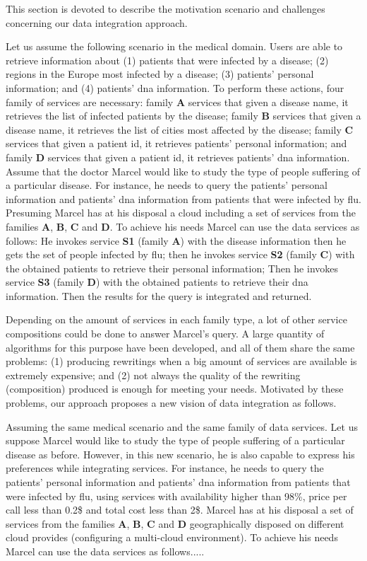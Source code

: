 This section is devoted to describe the motivation scenario and challenges
concerning our data integration approach.
%

Let us assume the following scenario in the medical domain. 
Users are able to retrieve information about (1) patients that were infected by a disease; 
(2) regions in the Europe most infected by a disease; 
(3) patients' personal information; and 
(4) patients' dna information.
To perform these actions, four family of services are necessary: family \textbf{A} services that given a disease name, it retrieves the list of infected patients by the disease; family \textbf{B} services that given a disease name, it retrieves the list of cities most affected by the disease; family \textbf{C} services that given a patient id, it retrieves patients' personal information; and family \textbf{D} services that given a patient id, it retrieves patients' dna information. Assume that the doctor Marcel would like to study the type of people suffering of a particular disease. For instance, he needs to query the patients' personal information and patients' dna information from patients that were infected by flu. Presuming Marcel has at his disposal a cloud including a set of services from the families \textbf{A}, \textbf{B}, \textbf{C} and \textbf{D}. To achieve his needs Marcel can use the data services  as follows: He invokes service \textbf{S1} (family \textbf{A}) with the disease information then he gets the set of people infected by flu; then he invokes service \textbf{S2} (family \textbf{C}) with the obtained patients to retrieve their personal information; Then he invokes service \textbf{S3} (family \textbf{D}) with the obtained patients to retrieve their dna information. Then the results for the query is integrated and returned.

Depending on the amount of services in each family type, a lot of other service compositions could be done to answer Marcel's query. A large quantity of algorithms for this purpose have been developed, and all of them share the same problems: (1) producing rewritings when a big amount of services are available is extremely expensive; and (2) not always the quality of the rewriting (composition) produced is enough for meeting your needs.
Motivated by these problems, our approach proposes a new vision of data integration as follows.

Assuming the same medical scenario and the same family of data services.
Let us suppose Marcel would like to study the type of people suffering of a particular disease as before. However, in this new scenario, he is also capable to express his preferences while integrating services. For instance, he needs to query the patients' personal information and patients' dna information from patients that were infected by flu, using services with availability higher than 98\%, price per call less than 0.2\$ and total cost less than 2\$. Marcel has at his disposal a set of services from the families \textbf{A}, \textbf{B}, \textbf{C} and \textbf{D} geographically disposed on different cloud provides (configuring a multi-cloud environment). 
To achieve his needs Marcel can use the data services  as follows.....
